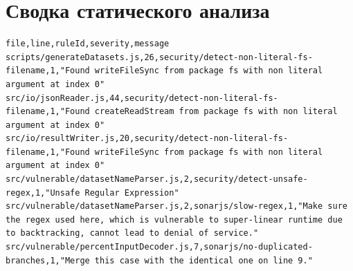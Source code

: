 \section*{Сводка статического анализа}
\begin{lstlisting}[basicstyle=\fontsize{8pt}{10pt}\selectfont\ttfamily,breaklines=true]
file,line,ruleId,severity,message
scripts/generateDatasets.js,26,security/detect-non-literal-fs-filename,1,"Found writeFileSync from package fs with non literal argument at index 0"
src/io/jsonReader.js,44,security/detect-non-literal-fs-filename,1,"Found createReadStream from package fs with non literal argument at index 0"
src/io/resultWriter.js,20,security/detect-non-literal-fs-filename,1,"Found writeFileSync from package fs with non literal argument at index 0"
src/vulnerable/datasetNameParser.js,2,security/detect-unsafe-regex,1,"Unsafe Regular Expression"
src/vulnerable/datasetNameParser.js,2,sonarjs/slow-regex,1,"Make sure the regex used here, which is vulnerable to super-linear runtime due to backtracking, cannot lead to denial of service."
src/vulnerable/percentInputDecoder.js,7,sonarjs/no-duplicated-branches,1,"Merge this case with the identical one on line 9."
\end{lstlisting}
